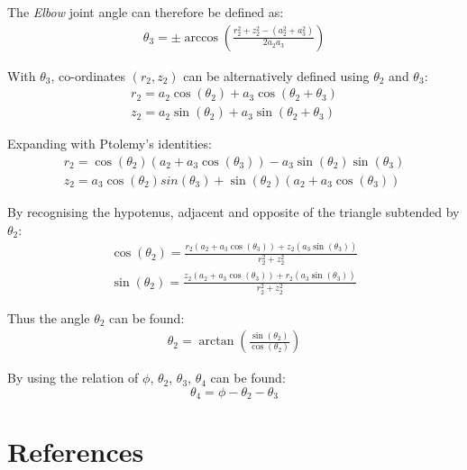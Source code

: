 \documentclass[9pt, a4paper]{article}
\begin{document}
The \textit{Elbow} joint angle can therefore be defined as:
\begin{gather*}
  \theta_3 = \pm \arccos \left( \frac{r_2^2 + z_2^2 - (a_2^2 + a_3^2)}{2 a_2 a_3} \right)
\end{gather*}

With $\theta_3$, co-ordinates $(r_2, z_2)$ can be alternatively defined using
$\theta_2$ and $\theta_3$:
\begin{gather*}
  r_2 = a_2 \cos(\theta_2) + a_3\cos(\theta_2 + \theta_3) \\ 
  z_2 = a_2 \sin(\theta_2) + a_3\sin(\theta_2 + \theta_3)
\end{gather*}

Expanding with Ptolemy's identities:
\begin{gather*}
  r_2 = \cos(\theta_2)\left(a_2 + a_3\cos(\theta_3)\right) - a_3\sin(\theta_2)\sin(\theta_3) \\ 
  z_2 = a_3\cos(\theta_2)sin(\theta_3) + \sin(\theta_2)(a_2 + a_3\cos(\theta_3))
\end{gather*}

By recognising the hypotenus, adjacent and opposite of the triangle subtended by
$\theta_2$:
\begin{gather*}
  \cos(\theta_2) = \frac{r_2(a_2 + a_3 \cos(\theta_3)) + z_2(a_3 \sin(\theta_3))}{r_2^2 + z_2^2} \\ 
  \sin(\theta_2) = \frac{z_2(a_2 + a_3 \cos(\theta_3)) + r_2(a_3 \sin(\theta_3))}{r_2^2 + z_2^2} 
\end{gather*}

Thus the angle $\theta_2$ can be found:
\begin{gather*}
  \theta_2 = \arctan \left(\frac{\sin(\theta_2)}{\cos(\theta_2)}\right)
\end{gather*}

By using the relation of $\phi$, $\theta_2$, $\theta_3$, $\theta_4$ can be
found:
$$
  \theta_4 = \phi - \theta_2 - \theta_3
$$

\pagebreak
\section{References}
\printbibliography
\end{document}
